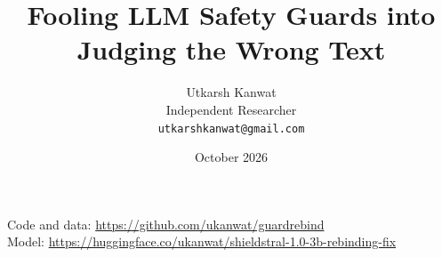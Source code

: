 \documentclass[11pt]{article}
\title{Fooling LLM Safety Guards into Judging the Wrong Text}
\author{Utkarsh Kanwat\\ Independent Researcher\\ \texttt{utkarshkanwat@gmail.com}}
\date{October 2026}
\begin{document}
\maketitle


\begin{center}\small Code and data: \url{https://github.com/ukanwat/guardrebind}\\ Model: \url{https://huggingface.co/ukanwat/shieldstral-1.0-3b-rebinding-fix}\end{center}













\appendix
{}%

\end{document}
